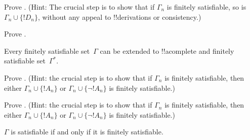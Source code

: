 \documentclass[../../../include/open-logic-section]{subfiles}
\begin{document}
\begin{prob}
Prove . (Hint: The crucial step
is to show that if $\Gamma_n$ is finitely satisfiable, so is $\Gamma_n
\cup \{!D_n\}$, without any appeal to !!{derivation}s or consistency.)
\end{prob}
\tagendprob


\begin{prob}
Prove .
\end{prob}
\tagendprob

\begin{lem}
 Every finitely satisfiable set~$\Gamma$
can be extended to !!a{complete} and finitely satisfiable
set~$\Gamma^*$.
\end{lem}

\begin{prob}
Prove .  (Hint: the crucial
step is to show that if $\Gamma_n$ is finitely satisfiable, then
either $\Gamma_n \cup \{!A_n\}$ or $\Gamma_n \cup \{\lnot !A_n\}$ is
finitely satisfiable.)
\end{prob}
\tagendprob

\begin{prob}
Prove .  (Hint: the crucial
step is to show that if $\Gamma_n$ is finitely satisfiable, then
either $\Gamma_n \cup \{!A_n\}$ or $\Gamma_n \cup \{\lnot !A_n\}$ is
finitely satisfiable.)
\end{prob}
\tagendprob

\begin{thm}[Compactness]
 $\Gamma$ is satisfiable if and only
if it is finitely satisfiable.
\end{thm}
\end{document}
